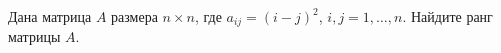 \documentclass{article}
\begin{document}
Дана матрица $A$ размера $n\times n$, где $a_{ij} = (i-j)^2$, $i,j = 1,\ldots,n$. Найдите ранг матрицы $A$. 
\end{document}
